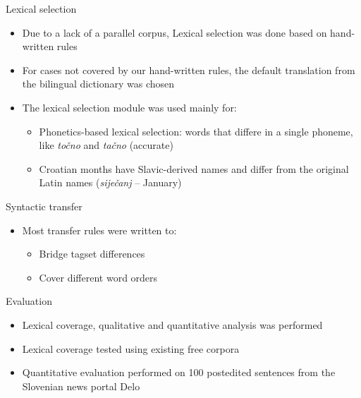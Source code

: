 \documentclass{beamer}
\begin{document}
\begin{frame}{Lexical selection}
\begin{itemize}
\item Due to a lack of a parallel corpus, Lexical selection was done based on hand-written rules
\item For cases not covered by our hand-written rules, the default translation from the bilingual dictionary was chosen
\item The lexical selection module was used mainly for:
\begin{itemize}
	\item Phonetics-based lexical selection: words that differe in a single phoneme, like \emph{to\v{c}no} and \emph{ta\v{c}no} (accurate)
	\item Croatian months have Slavic-derived names and differ from the original Latin names (\emph{sije\v{c}anj} -- January)
\end{itemize}
\end{itemize}
\end{frame}


\begin{frame}{Syntactic transfer}
\begin{itemize}
\item Most transfer rules were written to:
\begin{itemize}
\item Bridge tagset differences
\item Cover different word orders
\end{itemize}
\end{itemize}
\end{frame}


\begin{frame}{Evaluation}
\begin{itemize}
\item Lexical coverage, qualitative and quantitative analysis was performed
\item Lexical coverage tested using existing free corpora
\item Quantitative evaluation performed on 100 postedited sentences from the Slovenian news portal Delo

\end{itemize}
\end{frame}
\end{document}
